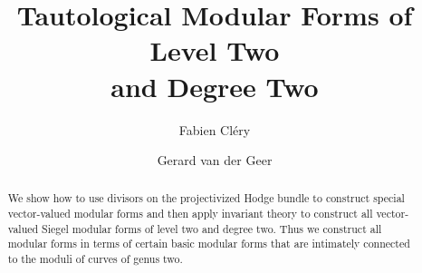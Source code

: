\documentclass[12pt]{amsart}
\numberwithin{equation}{section}
\numberwithin{equation}{section}
\theoremstyle{definition}
\theoremstyle{remark}
\begin{document}
\title[Tautological Modular Forms ]{Tautological Modular Forms of Level Two\\ and Degree Two}
\begin{abstract}
We show how to use divisors on the projectivized Hodge bundle to construct special 
vector-valued modular forms and then apply invariant theory to
construct all vector-valued Siegel modular forms of level two and degree two. Thus we
construct all modular forms 
in terms of certain basic modular forms that
 are intimately connected to the moduli of curves of genus two.
\end{abstract}

\author{Fabien Cl\'ery}
\address{Department of Mathematics, Loughborough University, UK}

\author{Gerard van der Geer}
\address{Korteweg-de Vries Instituut, Universiteit van
Amsterdam, Postbus 94248,
1090 GE  Amsterdam, The Netherlands}

\maketitle
\end{document}
